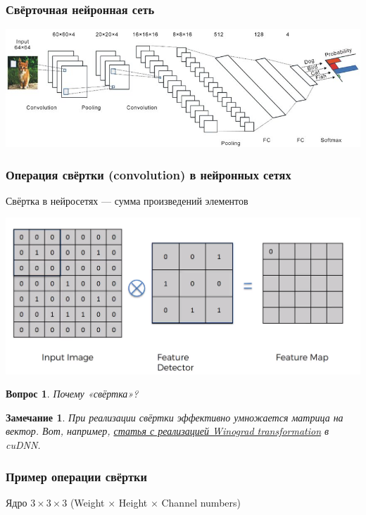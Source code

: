 \documentclass[fullscreen=true, bookmarks=true, hyperref={pdfencoding=unicode}]{beamer}
\newtheorem*{remark}{Замечание}
\newtheorem*{question}{Вопрос}
\begin{document}
\begin{frame}
  \frametitle{Свёрточная нейронная сеть}
  \begin{center}
    \includegraphics[keepaspectratio,
                     width=0.8\paperwidth]{cnn-example.png}
  \end{center}
\end{frame}


\begin{frame}
  \frametitle{Операция свёртки (convolution) в нейронных сетях}
  Свёртка в нейросетях — сумма произведений элементов
  \begin{center}
    \includegraphics[keepaspectratio,
                     width=0.8\paperwidth]{conv-example.png}
  \end{center}
\end{frame}


\begin{frame}
  \begin{question}
  Почему «свёртка»?
  \end{question}

  \begin{remark}
  При реализации свёртки эффективно умножается матрица на вектор. Вот, например, \href{https://arxiv.org/pdf/1509.09308.pdf}{статья с реализацией Winograd transformation} в cuDNN.
  \end{remark}
\end{frame}

\begin{frame}
  \frametitle{Пример операции свёртки}
  Ядро $3\times3\times3$ (Weight $\times$ Height $\times$ Channel numbers)
  \begin{center}
  \end{center}
\end{frame}
\end{document}

